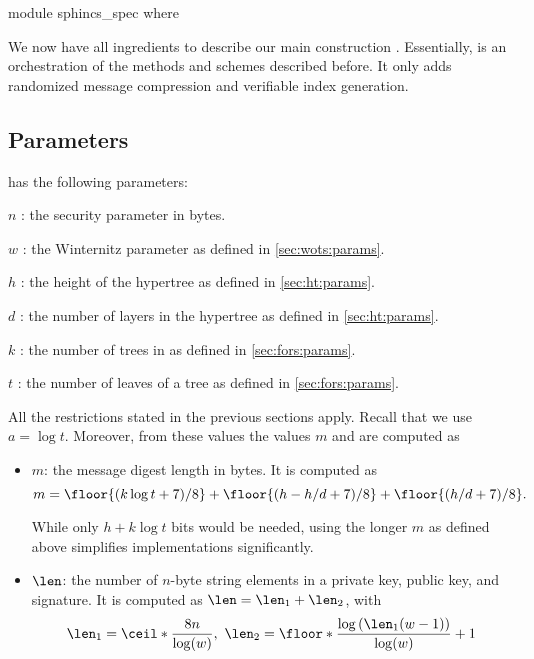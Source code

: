 %
\begin{code}
  module sphincs_spec where
\end{code}
\label{sec:spx}
We now have all ingredients to describe our main construction \spx.
Essentially, \spx is an orchestration of the methods and schemes described
before. It only adds randomized message compression and verifiable index
generation.

\subsection{\spx Parameters}

\spx has the following parameters:
\begin{description}
 \item  $n$ : the security parameter in bytes.
 \item  $w$ : the Winternitz parameter as defined in \autoref{sec:wots:params}.
 \item  $h$ : the height of the hypertree as defined in \autoref{sec:ht:params}.
 \item  $d$ : the number of layers in the hypertree as defined in \autoref{sec:ht:params}.
 \item  $k$ : the number of trees in \fors as defined in \autoref{sec:fors:params}.
 \item  $t$ : the number of leaves of a \fors tree as defined in \autoref{sec:fors:params}.
\end{description}

All the restrictions stated in the previous sections apply. Recall that
we use $a = \log t$. Moreover, from these values the values $m$ and \len are
computed as
\begin{itemize}
  \item $m$: the message digest length in bytes.
  It is computed as
  $$m=\floor{(k\log t +7)/ 8} + \floor{(h - h/d +7)/ 8} + \floor{(h / d +7)/ 8}.$$

  While only $h + k\log t$ bits would be needed, using the longer $m$ as defined
  above simplifies implementations significantly.
  \item $\len$: the number of $n$-byte string elements in a \wotsp private
        key, public key, and signature. It is computed as $\len =
        \len_1 + \len_2$, with
        \begin{equation*}
          \len_1 = \ceil*{\frac{8n}{\log(w)}},\
          \len_2 = \floor*{\frac{\log{(\len_1(w - 1))}}{\log(w)}} + 1
        \end{equation*}
\end{itemize}


